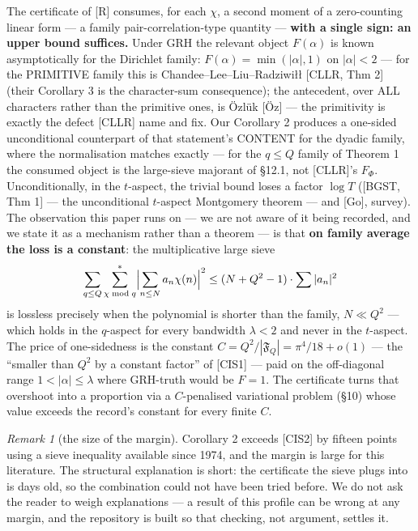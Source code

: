 \documentclass[11pt]{amsart}
\theoremstyle{plain}
\theoremstyle{remark}
\newtheorem*{remarkenv}{Remark}
\begin{document}
The certificate of [R] consumes, for each $\chi$, a second moment of a zero-counting
linear form --- a family pair-correlation-type quantity --- \textbf{with a single sign:
an upper bound suffices.} Under GRH the relevant object $F(\alpha)$ is known
asymptotically for the Dirichlet family: $F(\alpha) = \min(|\alpha|, 1)$ on
$|\alpha| < 2$ --- for the PRIMITIVE family this is Chandee--Lee--Liu--Radziwi\l\l{}
[CLLR, Thm 2] (their Corollary 3 is the character-sum consequence); the antecedent,
over ALL characters rather than the primitive ones, is \"Ozl\"uk [\"Oz] --- the
primitivity is exactly the defect [CLLR] name and fix. Our Corollary 2 produces a
one-sided unconditional counterpart of that statement's CONTENT for the dyadic family,
where the normalisation matches exactly --- for the $q \le Q$ family of Theorem 1 the
consumed object is the large-sieve majorant of \S12.1, not [CLLR]'s $F_\Phi$.
Unconditionally, in the $t$-aspect, the trivial bound loses a factor $\log T$
([BGST, Thm 1] --- the unconditional $t$-aspect Montgomery theorem --- and [Go],
survey). The observation this paper runs on --- we are not aware of it being recorded,
and we state it as a mechanism rather than a theorem --- is that \textbf{on family
average the loss is a constant}: the multiplicative large sieve
\[
\sum_{q\le Q} \sum^{*}_{\chi \bmod q} \Bigl|\sum_{n\le N} a_n \chi(n)\Bigr|^2
\le (N + Q^2 - 1)\cdot\sum|a_n|^2
\]
is lossless precisely when the polynomial is shorter than the family, $N \ll Q^2$ ---
which holds in the $q$-aspect for every bandwidth $\lambda < 2$ and never in the
$t$-aspect. The price of one-sidedness is the constant
$C = Q^2/|\mathfrak{F}_Q| = \pi^4/18 + o(1)$ --- the ``smaller than $Q^2$ by a
constant factor'' of [CIS1] --- paid on the off-diagonal range $1 < |\alpha| \le \lambda$
where GRH-truth would be $F = 1$. The certificate turns that overshoot into a
proportion via a $C$-penalised variational problem (\S10) whose value exceeds the
record's constant for every finite $C$.

\begin{remarkenv}[the size of the margin]
Corollary 2 exceeds [CIS2] by fifteen points using a sieve inequality available since
1974, and the margin is large for this literature. The structural explanation is
short: the certificate the sieve plugs into is days old, so the combination could not
have been tried before. We do not ask the reader to weigh explanations --- a result of
this profile can be wrong at any margin, and the repository is built so that checking,
not argument, settles it.
\end{remarkenv}
\end{document}
